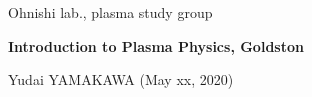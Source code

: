 \documentclass[10pt,dvipdfmx,landscape]{jsarticle}
\begin{document}
%
%
%
\noindent
{\footnotesize
Ohnishi lab., plasma study group
}

\noindent
	\textbf{\Large
		Introduction to Plasma Physics, Goldston
	}

	\vspace{1ex}

\noindent
	\textrm{\small 
		Yudai YAMAKAWA (May xx, 2020)
	}



\vspace{4ex}


\end{document}
